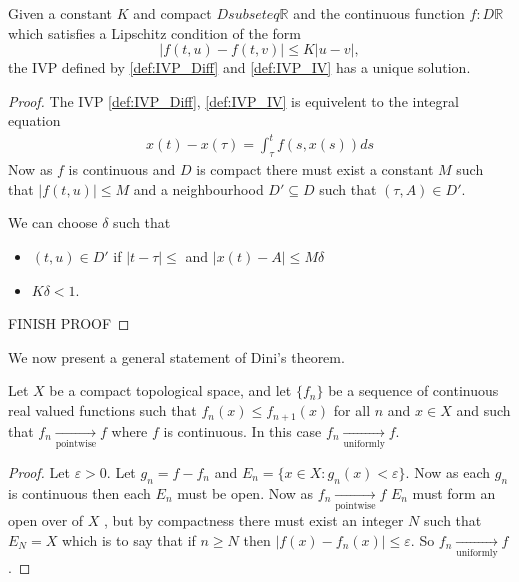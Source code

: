 \documentclass{unswmaths}
\begin{document}
\begin{unswlem}
	Given a constant $K $ and compact $ D subseteq \mathbb{R} $ and the continuous function $ f : D \mathbb{R} $ which
	satisfies a Lipschitz condition of the form 
	$$ | f(t,u) - f(t,v) | \leq K | u - v |, $$ the IVP defined by \ref{def:IVP_Diff} and \ref{def:IVP_IV} 
	has a unique solution.
\end{unswlem}
\begin{proof}
	The IVP \ref{def:IVP_Diff}, \ref{def:IVP_IV} is equivelent to the integral equation
	\begin{align}
		\label{eq:IVP_Integral}
		x(t) - x(\tau) = \int_\tau^t f(s,x(s)) ds 
	\end{align}
	Now as $ f $ is continuous and $ D $ is compact there must exist a constant $ M $ such that
	$ | f(t,u) | \leq M $ and a neighbourhood $ D' \subseteq D $ such that $ (\tau, A) \in D' $.
	
	We can choose $ \delta $ such that 
	\begin{itemize}
		\item $ (t, u) \in D' $ if $ | t - \tau | \leq $ and $ | x(t) - A | \leq M \delta $
		\item $ K\delta < 1 $.
	\end{itemize}
	
	FINISH PROOF
	
\end{proof}
We now present a general statement of Dini's theorem.
\begin{unswthm}
    \label{thm:Dini}
	Let $ X $ be a compact topological space, and let $ \{ f_n \} $ be a 
	sequence of continuous real valued functions such that
	$ f_n(x) \leq f_{n+1}(x) $ for all $ n $ and $ x \in X $ and such that $ f_n \underset{\text{pointwise}}{\longrightarrow} f $
	where $ f $ is continuous. In this case $ f_n \underset{\text{uniformly}}{\longrightarrow} f $.
\end{unswthm}
\begin{proof}
    Let $ \varepsilon > 0 $. Let $ g_n = f - f_n $ and $ E_n = \{ x \in X : g_n(x) < \varepsilon \} $. Now as
    each $ g_n $ is continuous then each $ E_n $ must be open. Now as $ f_n \underset{\text{pointwise}}{\longrightarrow} f $
    $ E_n $ must form an open over of $ X $ , but by compactness there must exist an integer $ N $ such that
    $ E_N = X $ which is to say that if $ n \geq N $ then $ |f(x) - f_n(x)| \leq \varepsilon $.
    So $ f_n \underset{\text{uniformly}}{\longrightarrow} f $.
\end{proof}
\end{document}
